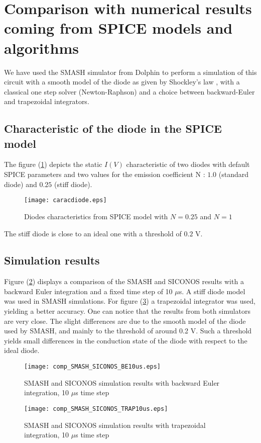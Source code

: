 \documentclass[10pt]{article}
\begin{document}
\section{Comparison with numerical results coming from SPICE models and algorithms}
We have used the SMASH simulator from Dolphin to perform a simulation of this circuit with a smooth model
of the diode as given by Shockley's law , with a classical one step solver (Newton-Raphson) and a choice between 
backward-Euler and trapezoidal integrators.

\subsection{Characteristic of the diode in the SPICE model}
The figure (\ref{fig-carac-diode}) depicts the static $I(V)$ characteristic of two diodes with default SPICE parameters
and two values for the emission coefficient N : $1.0$ (standard diode) and $0.25$ (stiff diode).

\begin{figure}[hbt]
\begin{center}
\texttt{[image: caracdiode.eps]}
\end{center}
\caption{Diodes characteristics from SPICE model with $N=0.25$ and $N=1$}
\label{fig-carac-diode}
\end{figure}
 
The stiff diode is close to an ideal one with a threshold of $0.2$ V.

\subsection{Simulation results}
Figure (\ref{fig-comp-SMASH-SICONOS-BE10us}) displays a comparison of the SMASH and SICONOS results with
a backward Euler integration and a fixed time step of 10 $\mu$s. A stiff diode model was used in SMASH simulations.
For figure (\ref{fig-comp-SMASH-SICONOS-TRAP10us}) a trapezoidal integrator was used, yielding a better accuracy.
One can notice that the results from both simulators are very close. The slight differences are due to the smooth 
model of the diode used by SMASH, and mainly to the threshold of around 0.2 V. Such a threshold
yields small differences in the conduction state of the diode with respect to the ideal diode.

\begin{figure}[hbt]
\begin{center}
\texttt{[image: comp\_SMASH\_SICONOS\_BE10us.eps]}
\end{center}
\caption{SMASH and SICONOS simulation results with backward Euler integration, 10 $\mu$s time step}
\label{fig-comp-SMASH-SICONOS-BE10us}
\end{figure}

\begin{figure}[hbt]
\begin{center}
\texttt{[image: comp\_SMASH\_SICONOS\_TRAP10us.eps]}
\end{center}
\caption{SMASH and SICONOS simulation results with trapezoidal integration, 10 $\mu$s time step}
\label{fig-comp-SMASH-SICONOS-TRAP10us}
\end{figure}
\end{document}
